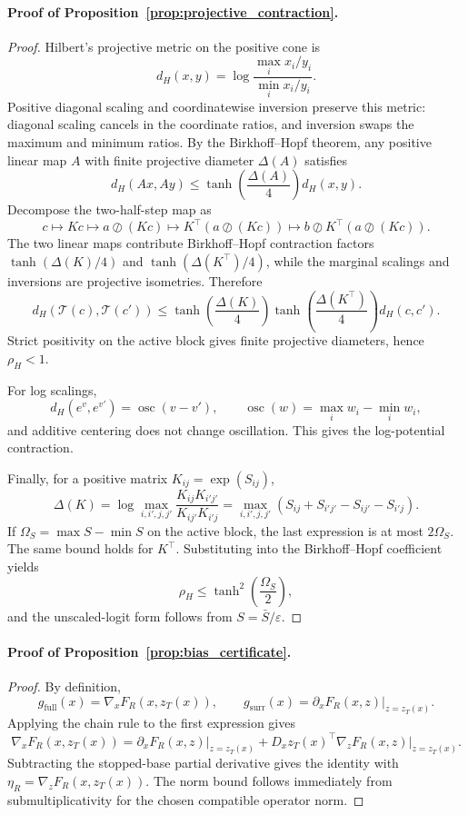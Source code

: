 \documentclass{article}
\begin{document}
\paragraph{Proof of Proposition~\ref{prop:projective_contraction}.}
\begin{proof}
Hilbert's projective metric on the positive cone is
\[
d_H(x,y)=
\log
\frac{\max_i x_i/y_i}{\min_i x_i/y_i}.
\]
Positive diagonal scaling and coordinatewise inversion preserve this metric: diagonal scaling cancels in the coordinate ratios, and inversion swaps the maximum and minimum ratios. By the Birkhoff--Hopf theorem, any positive linear map $A$ with finite projective diameter $\Delta(A)$ satisfies
\[
d_H(Ax,Ay)
\le
\tanh\!\left(\frac{\Delta(A)}{4}\right)d_H(x,y).
\]
Decompose the two-half-step map as
\[
c
\mapsto
Kc
\mapsto
a\oslash(Kc)
\mapsto
K^\top(a\oslash(Kc))
\mapsto
b\oslash K^\top(a\oslash(Kc)).
\]
The two linear maps contribute Birkhoff--Hopf contraction factors
$\tanh(\Delta(K)/4)$ and $\tanh(\Delta(K^\top)/4)$, while the marginal scalings and inversions are projective isometries. Therefore
\[
d_H(\mathcal{T}(c),\mathcal{T}(c'))
\le
\tanh\!\left(\frac{\Delta(K)}{4}\right)
\tanh\!\left(\frac{\Delta(K^\top)}{4}\right)
d_H(c,c').
\]
Strict positivity on the active block gives finite projective diameters, hence $\rho_H<1$.

For log scalings,
\[
d_H(e^v,e^{v'})
=
\operatorname{osc}(v-v'),
\qquad
\operatorname{osc}(w)=\max_i w_i-\min_i w_i,
\]
and additive centering does not change oscillation. This gives the log-potential contraction.

Finally, for a positive matrix $K_{ij}=\exp(S_{ij})$,
\[
\Delta(K)
=
\log\max_{i,i',j,j'}
\frac{K_{ij}K_{i'j'}}{K_{ij'}K_{i'j}}
=
\max_{i,i',j,j'}
\left(S_{ij}+S_{i'j'}-S_{ij'}-S_{i'j}\right).
\]
If $\Omega_S=\max S-\min S$ on the active block, the last expression is at most $2\Omega_S$. The same bound holds for $K^\top$. Substituting into the Birkhoff--Hopf coefficient yields
\[
\rho_H
\le
\tanh^2\!\left(\frac{\Omega_S}{2}\right),
\]
and the unscaled-logit form follows from $S=\bar S/\varepsilon$.
\end{proof}

\paragraph{Proof of Proposition~\ref{prop:bias_certificate}.}
\begin{proof}
By definition,
\[
g_{\mathrm{full}}(x)=\nabla_x F_R(x,z_T(x)),
\qquad
g_{\mathrm{surr}}(x)=\partial_x F_R(x,z)\big|_{z=z_T(x)}.
\]
Applying the chain rule to the first expression gives
\[
\nabla_x F_R(x,z_T(x))
=
\partial_x F_R(x,z)\big|_{z=z_T(x)}
+
D_xz_T(x)^\top \nabla_zF_R(x,z)\big|_{z=z_T(x)}.
\]
Subtracting the stopped-base partial derivative gives the identity with $\eta_R=\nabla_zF_R(x,z_T(x))$. The norm bound follows immediately from submultiplicativity for the chosen compatible operator norm.
\end{proof}
\end{document}
